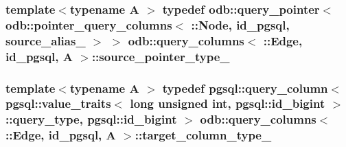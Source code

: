 \subsubsection[{source\+\_\+pointer\+\_\+type\+\_\+}]{\setlength{\rightskip}{0pt plus 5cm}template$<$typename A $>$ typedef odb\+::query\+\_\+pointer$<$ odb\+::pointer\+\_\+query\+\_\+columns$<$ \+::{\bf Node}, id\+\_\+pgsql, {\bf source\+\_\+alias\+\_\+} $>$ $>$ odb\+::query\+\_\+columns$<$ \+::{\bf Edge}, id\+\_\+pgsql, A $>$\+::{\bf source\+\_\+pointer\+\_\+type\+\_\+}}\label{structodb_1_1query__columns_3_01_1_1_edge_00_01id__pgsql_00_01_a_01_4_aba8b61cdeb2c359f6cc1e53aac7d1e71}
\hypertarget{structodb_1_1query__columns_3_01_1_1_edge_00_01id__pgsql_00_01_a_01_4_a6a5cf515c948a27412f493cfe21d7113}{}
\subsubsection[{target\+\_\+column\+\_\+type\+\_\+}]{\setlength{\rightskip}{0pt plus 5cm}template$<$typename A $>$ typedef pgsql\+::query\+\_\+column$<$ pgsql\+::value\+\_\+traits$<$ long unsigned int, pgsql\+::id\+\_\+bigint $>$\+::query\+\_\+type, pgsql\+::id\+\_\+bigint $>$ odb\+::query\+\_\+columns$<$ \+::{\bf Edge}, id\+\_\+pgsql, A $>$\+::{\bf target\+\_\+column\+\_\+type\+\_\+}}\label{structodb_1_1query__columns_3_01_1_1_edge_00_01id__pgsql_00_01_a_01_4_a6a5cf515c948a27412f493cfe21d7113}
\hypertarget{structodb_1_1query__columns_3_01_1_1_edge_00_01id__pgsql_00_01_a_01_4_a514ebc8051388738a437107b5cb4038f}{}
